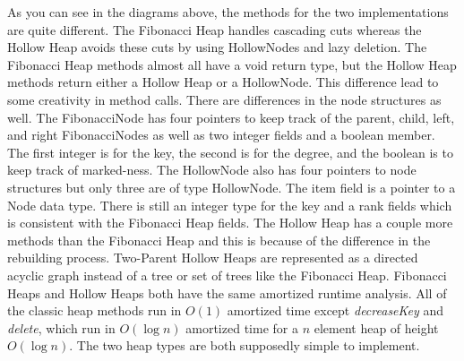 \documentclass[letter,10pt]{article}
\begin{document}
\quad As you can see in the diagrams above, the methods for the two implementations are quite different. The Fibonacci Heap handles cascading cuts whereas the Hollow Heap avoids these cuts by using HollowNodes and lazy deletion. The Fibonacci Heap methods almost all have a void return type, but the Hollow Heap methods return either a Hollow Heap or a HollowNode. This difference lead to some creativity in method calls. There are differences in the node structures as well. The FibonacciNode has four pointers to keep track of the parent, child, left, and right FibonacciNodes as well as two integer fields and a boolean member. The first integer is for the key, the second is for the degree, and the boolean is to keep track of marked-ness. The HollowNode also has four pointers to node structures but only three are of type HollowNode. The item field is a pointer to a Node data type. There is still an integer type for the key and a rank fields which is consistent with the Fibonacci Heap fields. The Hollow Heap has a couple more methods than the Fibonacci Heap and this is because of the difference in the rebuilding process. Two-Parent Hollow Heaps are represented as a directed acyclic graph instead of a tree or set of trees like the Fibonacci Heap. Fibonacci Heaps and Hollow Heaps both have the same amortized runtime analysis. All of the classic heap methods run in $O(1)$ amortized time except \textit{decreaseKey} and \textit{delete}, which run in $O(\log n)$ amortized time for a $n$ element heap of height $O(\log n)$. The two heap types are both supposedly simple to implement. 
\end{document}
